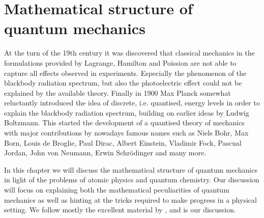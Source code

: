 \chapter{Mathematical structure of quantum mechanics}


At the turn of the 19th century it was discovered
that classical mechanics in the formulations provided
by Lagrange, Hamilton and Poission
are not able to capture all effects observed in experiments.
Especially the phenomenon of the blackbody radiation spectrum,
but also the photoelectric effect could not be explained by the available theory.
Finally in 1900 Max Planck somewhat reluctantly introduced the idea of
discrete, i.e. quantised, energy levels
in order to explain the blackbody radiation spectrum,
building on earlier ideas by Ludwig Boltzmann.
This started the development of a quantised theory of mechanics
with major contributions by nowadays famous
names such as Niels Bohr, Max Born, Louis de Broglie, Paul Dirac, Albert Einstein, Vladimir Fock, Pascual Jordan, John von Neumann, Erwin Schrödinger and many more.

In this chapter we will discuss the mathematical structure
of quantum mechanics in light of the problems of atomic physics
and quantum chemistry.
Our discussion will focus on explaining both the mathematical
peculiarities of quantum mechanics as well as hinting
at the tricks required to make progress in a physical setting.
We follow mostly the excellent material by \citet{Shankar1994},
\citet{Mueller2000} and \citet{Helffer2013} is our discussion.





